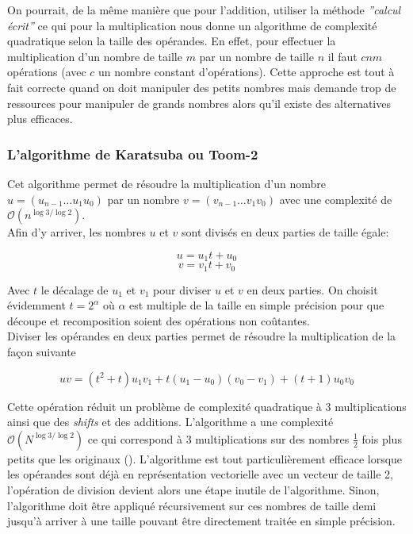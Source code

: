 \documentclass[letterpaper]{article}
\begin{document}
On pourrait, de la même manière que pour l'addition, utiliser la méthode
\emph{''calcul écrit''} ce qui pour la multiplication nous donne un algorithme de
complexité quadratique selon la taille des opérandes.
En effet, pour effectuer la multiplication d'un nombre de taille $m$ par un nombre
de taille $n$ il faut $cnm$ opérations (avec $c$ un nombre constant
d'opérations).
Cette approche est tout à fait correcte quand on doit manipuler des petits
nombres mais demande trop de ressources pour manipuler de grands nombres alors
qu'il existe des alternatives plus efficaces.

\subsubsection{L'algorithme de Karatsuba ou Toom-2}

Cet algorithme permet de résoudre la multiplication d'un nombre
$u = (u_{n-1} \dots u_1 u_0)$ par un nombre $v = (v_{n-1} \dots v_1 v_0)$
avec une complexité de $\mathcal{O}(n^{\log{3}/\log{2}})$.\\

Afin d'y arriver, les nombres $u$ et $v$ sont divisés en deux parties de taille
égale:

  $$u = u_1 t + u_0$$
  $$v = v_1 t + v_0$$

Avec $t$ le décalage de $u_1$ et $v_1$ pour diviser $u$ et $v$ en deux parties.
On choisit évidemment $t = 2^\alpha$ où $\alpha$ est multiple de la taille en
simple précision pour que découpe et recomposition soient des opérations non
coûtantes.\\

Diviser les opérandes en deux parties permet de résoudre la multiplication
de la façon suivante

  $$uv = (t^{2} + t) u_1 v_1 + t (u_1 - u_0) (v_0 - v_1) + (t + 1) u_0 v_0$$

Cette opération réduit un problème de complexité quadratique à 3 multiplications
ainsi que des \emph{shifts} et des additions.
L'algorithme a une complexité $\mathcal{O}(N^{\log{3}/\log{2}})$ ce qui
correspond à $3$ multiplications sur des nombres $\frac{1}{2}$ fois plus petits
que les originaux (\cite{gmplibkaratsuba}).
L'algorithme est tout particulièrement efficace lorsque les opérandes sont déjà
en représentation vectorielle avec un vecteur de taille 2, l'opération de
division devient alors une étape inutile de l'algorithme. Sinon, l'algorithme
doit être appliqué récursivement sur ces nombres de taille demi jusqu'à arriver
à une taille pouvant être directement traitée en simple précision.
\end{document}
